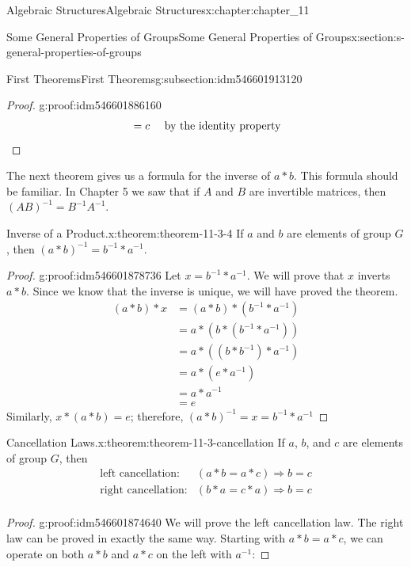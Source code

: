 \documentclass[oneside,10pt,]{book}
\newcommand{\qedhere}{\relax}
\numberwithin{equation}{section}
\begin{document}
\begin{chapterptx}{Algebraic Structures}{}{Algebraic Structures}{}{}{x:chapter:chapter_11}
\begin{sectionptx}{Some General Properties of Groups}{}{Some General Properties of Groups}{}{}{x:section:s-general-properties-of-groups}
\begin{subsectionptx}{First Theorems}{}{First Theorems}{}{}{g:subsection:idm546601913120}
\begin{proof}{}{g:proof:idm546601886160}
\begin{equation*}
\begin{split}
& = c \quad \textrm{ by the identity property}\\
\end{split}\qedhere
\end{equation*}
%
\end{proof}
The next theorem gives us a formula for the inverse of \(a * b\). This formula should be familiar. In Chapter 5 we saw that if \(A\) and \(B\) are invertible matrices, then \((A B)^{-1}= B^{-1} A^{-1}\).%
\begin{theorem}{Inverse of a Product.}{}{x:theorem:theorem-11-3-4}%
If \(a\) and \(b\) are elements of group \(G\), then \((a*b)^{-1}= b^{-1}*a^{-1}\).%
\end{theorem}
\begin{proof}{}{g:proof:idm546601878736}
Let \(x = b^{-1}*a^{-1}\). We will prove that \(x\) inverts \(a * b\).  Since we know that the inverse is unique, we will have proved the theorem.%
\begin{equation*}
\begin{split}
(a * b) * x &= (a * b) * \left(b^{-1}*a^{-1}\right)\\
&= a* \left(b*\left(b^{-1}*a^{-1}\right)\right)\\
&= a*\left(\left(b*b^{-1}\right)*a^{-1}\right)\\
&= a * \left(e * a^{-1}\right)\\
&= a * a^{-1}\\
&= e
\end{split}
\end{equation*}
Similarly, \(x * (a * b) = e\); therefore, \((a*b)^{-1}=x= b^{-1}*a^{-1}\)%
\end{proof}
\begin{theorem}{Cancellation Laws.}{}{x:theorem:theorem-11-3-cancellation}%
%
If \(a\), \(b\), and \(c\) are elements of group \(G\), then%
\begin{equation*}
\begin{array}{lc}
\textrm{left cancellation:}& (a * b = a * c)  \Rightarrow b = c\\
\textrm{right cancellation:}&  (b * a = c * a) \Rightarrow b = c\\
\end{array}
\end{equation*}
%
\end{theorem}
\begin{proof}{}{g:proof:idm546601874640}
We will prove the left cancellation law. The right law can be proved in exactly the same way. Starting with \(a * b = a * c\), we can operate on both \(a * b\) and \(a * c\) on the left with \(a^{-1}\):%

\end{proof}
\end{subsectionptx}
\end{sectionptx}
\end{chapterptx}
\end{document}
